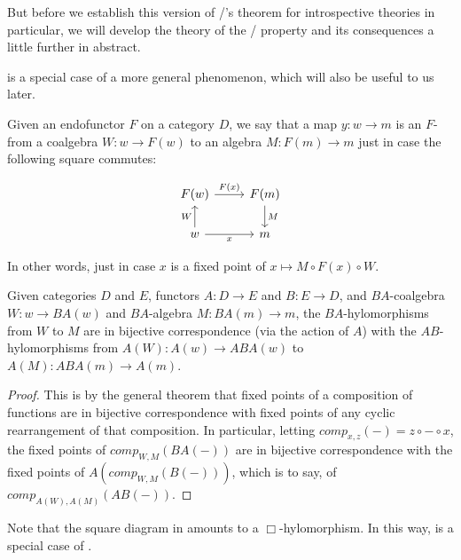 But before we establish this version of \Loeb/'s theorem for introspective theories in particular, we will develop the theory of the \Loeb/ property and its consequences a little further in abstract.

 is a special case of a more general phenomenon, which will also be useful to us later.

\begin{definition}
Given an endofunctor $F$ on a category $D$, we say that a map $y : w \to m$ is an $F$- from a coalgebra $W : w \to F(w)$ to an algebra $M : F(m) \to m$ just in case the following square commutes:

\[\begin{tikzcd}
	{F(w)} & {F(m)} \\
	w & m
	\arrow["W", from=2-1, to=1-1]
	\arrow["{F(x)}", from=1-1, to=1-2]
	\arrow["M", from=1-2, to=2-2]
	\arrow["x"', from=2-1, to=2-2]
\end{tikzcd}\]

In other words, just in case $x$ is a fixed point of $x \mapsto M \circ F(x) \circ W$.
\end{definition}

\begin{theorem}\label{HylomorphismTransfer}
Given categories $D$ and $E$, functors $A : D \to E$ and $B : E \to D$, and $BA$-coalgebra $W : w \to BA(w)$ and $BA$-algebra $M : BA(m) \to m$, the $BA$-hylomorphisms from $W$ to $M$ are in bijective correspondence (via the action of $A$) with the $AB$-hylomorphisms from $A(W) : A(w) \to ABA(w)$ to $A(M) : ABA(m) \to A(m)$.
\end{theorem}
\begin{proof}
This is by the general theorem that fixed points of a composition of functions are in bijective correspondence with fixed points of any cyclic rearrangement of that composition. In particular, letting $comp_{x, z}(-) = z \circ - \circ x$, the fixed points of $comp_{W, M}(BA(-))$ are in bijective correspondence with the fixed points of $A(comp_{W, M}(B(-)))$, which is to say, of $comp_{A(W), A(M)}(AB(-))$.
\end{proof}

Note that the square diagram in  amounts to a $\Box$-hylomorphism. In this way,  is a special case of .

